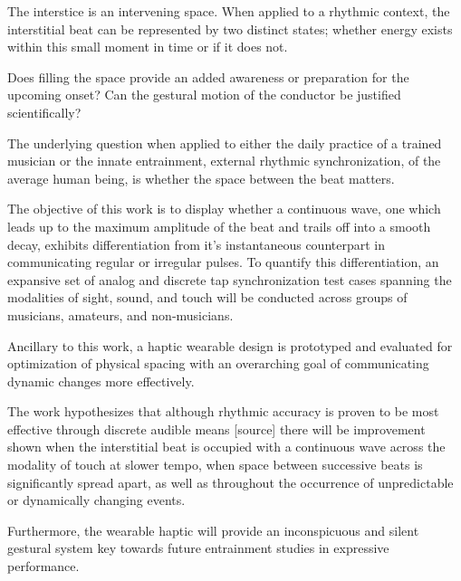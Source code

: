 
\setlength{\parskip}{1em}
\setlength{\parindent}{0em}

\noindent
The interstice is an intervening space. When applied to a rhythmic context, the interstitial beat can be represented by two distinct states; whether energy exists within this small moment in time or if it does not. 

Does filling the space provide an added awareness or preparation for the upcoming onset? Can the gestural motion of the conductor be justified scientifically?

The underlying question when applied to either the daily practice of a trained musician or the innate entrainment, external rhythmic synchronization, of the average human being, is whether the space between the beat matters.

The objective of this work is to display whether a continuous wave, one which leads up to the maximum amplitude of the beat and trails off into a smooth decay, exhibits differentiation from it's instantaneous counterpart in communicating regular or irregular pulses. To quantify this differentiation, an expansive set of analog and discrete tap synchronization test cases spanning the modalities of sight, sound, and touch will be conducted across groups of musicians, amateurs, and non-musicians.

Ancillary to this work, a haptic wearable design is prototyped and evaluated for optimization of physical spacing with an overarching goal of communicating dynamic changes more effectively.

The work hypothesizes that although rhythmic accuracy is proven to be most effective through discrete audible means [source] there will be improvement shown when the interstitial beat is occupied with a continuous wave across the modality of touch at slower tempo, when space between successive beats is significantly spread apart, as well as throughout the occurrence of unpredictable or dynamically changing events. 

Furthermore, the wearable haptic will provide an inconspicuous and silent gestural system key towards future entrainment studies in expressive performance.
